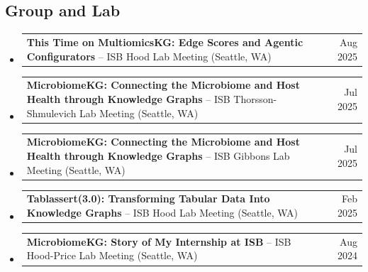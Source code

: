 \documentclass[11pt]{moderncv}
\begin{document}
\subsection*{Group and Lab}
\begin{itemize}[leftmargin=*]
\item \begin{tabularx}{\linewidth}{@{}>{\raggedright\arraybackslash}X r@{}}
\textbf{This Time on MultiomicsKG: Edge Scores and Agentic Configurators} --
ISB Hood Lab Meeting (Seattle, WA) & Aug 2025 \\
\end{tabularx}
\item \begin{tabularx}{\linewidth}{@{}>{\raggedright\arraybackslash}X r@{}}
\textbf{MicrobiomeKG: Connecting the Microbiome and Host Health through Knowledge Graphs} --
ISB Thorsson-Shmulevich Lab Meeting (Seattle, WA) & Jul 2025 \\
\end{tabularx}
\item \begin{tabularx}{\linewidth}{@{}>{\raggedright\arraybackslash}X r@{}}
\textbf{MicrobiomeKG: Connecting the Microbiome and Host Health through Knowledge Graphs} --
ISB Gibbons Lab Meeting (Seattle, WA) & Jul 2025 \\
\end{tabularx}
\item \begin{tabularx}{\linewidth}{@{}>{\raggedright\arraybackslash}X r@{}}
\textbf{Tablassert(3.0): Transforming Tabular Data Into Knowledge Graphs} --
ISB Hood Lab Meeting (Seattle, WA) & Feb 2025 \\
\end{tabularx}
\item \begin{tabularx}{\linewidth}{@{}>{\raggedright\arraybackslash}X r@{}}
\textbf{MicrobiomeKG: Story of My Internship at ISB} --
ISB Hood-Price Lab Meeting (Seattle, WA) & Aug 2024 \\
\end{tabularx}
\end{itemize}
\newpage
\end{document}
